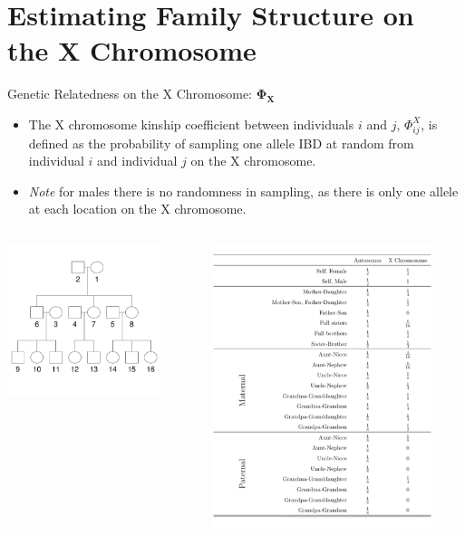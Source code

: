\documentclass{beamer}
\begin{document}
\section{Estimating Family Structure on the X Chromosome}
\begin{frame}{Genetic Relatedness on the X Chromosome: $\mathbf{\Phi_X}$}
\begin{itemize}
\item The X chromosome kinship coefficient between individuals $i$ and $j$, $\Phi^X_{ij}$,  is defined as the probability of sampling one allele IBD at random from individual $i$ and individual $j$ on the X chromosome.
\item \textit{Note} for males there is no randomness in sampling, as there is only one allele at each location on the X chromosome.
\end{itemize}
\end{frame}

\begin{frame}
\begin{columns}
    \begin{column}{0.3\textwidth}
      \centering
      \includegraphics[height=4.5cm]{../pedigree_16individs.pdf}
    \end{column}
    \begin{column}{0.5\textwidth}
      \centering
      \includegraphics[height=8.3cm]{../olga_presentation_26jan15/xchr_kc_values.pdf}
    \end{column}
 \end{columns}
\end{frame}
\end{document}
